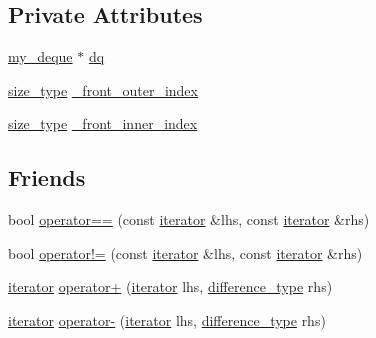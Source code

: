 \subsection*{Private Attributes}
\begin{DoxyCompactItemize}
\item 
\hyperlink{classmy__deque}{my\-\_\-deque} $\ast$ \hyperlink{classmy__deque_1_1iterator_a00058b213271faa0b36b8e8137d015f1}{dq}
\item 
\hyperlink{classmy__deque_1_1iterator_a23ff400617b1c6b42ff3f67fb318d19d}{size\-\_\-type} \hyperlink{classmy__deque_1_1iterator_a418fb5071b8437c9a0259ad1cb19aeb8}{\-\_\-front\-\_\-outer\-\_\-index}
\item 
\hyperlink{classmy__deque_1_1iterator_a23ff400617b1c6b42ff3f67fb318d19d}{size\-\_\-type} \hyperlink{classmy__deque_1_1iterator_a384bcfc2da11135412c0211261464f95}{\-\_\-front\-\_\-inner\-\_\-index}
\end{DoxyCompactItemize}
\subsection*{Friends}
\begin{DoxyCompactItemize}
\item 
bool \hyperlink{classmy__deque_1_1iterator_a27d0df37bd079bf4e62faa0b468b060c}{operator==} (const \hyperlink{classmy__deque_1_1iterator}{iterator} \&lhs, const \hyperlink{classmy__deque_1_1iterator}{iterator} \&rhs)
\item 
bool \hyperlink{classmy__deque_1_1iterator_aad2b3926ed1e2db6f22ca3117766181b}{operator!=} (const \hyperlink{classmy__deque_1_1iterator}{iterator} \&lhs, const \hyperlink{classmy__deque_1_1iterator}{iterator} \&rhs)
\item 
\hyperlink{classmy__deque_1_1iterator}{iterator} \hyperlink{classmy__deque_1_1iterator_aaf128f38c16b5a8284f51a9c69f6fd77}{operator+} (\hyperlink{classmy__deque_1_1iterator}{iterator} lhs, \hyperlink{classmy__deque_1_1iterator_ac5f62e8566ad92478931c2abd9ac6596}{difference\-\_\-type} rhs)
\item 
\hyperlink{classmy__deque_1_1iterator}{iterator} \hyperlink{classmy__deque_1_1iterator_ab8892736ecb2ffe5f6b9ac9b9dbb60c0}{operator-\/} (\hyperlink{classmy__deque_1_1iterator}{iterator} lhs, \hyperlink{classmy__deque_1_1iterator_ac5f62e8566ad92478931c2abd9ac6596}{difference\-\_\-type} rhs)
\end{DoxyCompactItemize}


